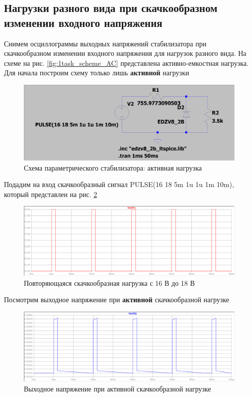 \documentclass[a4paper, 12pt]{article}
\begin{document}
    \subsection{Нагрузки разного вида при скачкообразном изменении входного напряжения}
    Снимем осциллограммы выходных напряжений стабилизатора при скачкообразном
    изменении входного напряжения для нагрузок разного вида. На схеме на рис. \ref{fig:1task_scheme_AC}
    представлена активно-емкостная нагрузка. Для начала построим схему только лишь \textbf{активной} нагрузки
    \begin{figure}[H]
        \centering
        \includegraphics[scale=0.22]{1task_scheme_A.png}
        \captionsetup{skip=0pt}
        \caption{Схема параметрического стабилизатора: активная нагрузка}
        \label{fig:1task_scheme_A}
    \end{figure}
    \noindent Подадим на вход скачкообразный сигнал PULSE(16 18 5m 1u 1u 1m 10m), который
    представлен на рис. \ref{fig:1task_rect_input}
    \begin{figure}[H]
        \centering
        \includegraphics[scale=0.46]{1task_rect_input.png}
        \captionsetup{skip=0pt}
        \caption{Повторяющаяся скачкообразная нагрузка с 16 В до 18 В}
        \label{fig:1task_rect_input}
    \end{figure}
    Посмотрим выходное напряжение при \textbf{активной} скачкообразной нагрузке
    \begin{figure}[H]
        \centering
        \includegraphics[scale=0.46]{1task_rect_A.png}
        \captionsetup{skip=0pt}
        \caption{Выходное напряжение при активной скачкообразной нагрузке}
        \label{fig:1task_rect_A}
    \end{figure}
\end{document}
